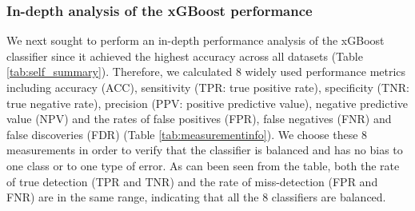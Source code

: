 \documentclass{bmcart}
\begin{document}
\subsubsection*{In-depth analysis of the xGBoost performance}
We next sought to perform an in-depth performance analysis of the xGBoost classifier since it achieved the highest accuracy across all datasets (Table \ref{tab:self_summary}). Therefore, we calculated 8 widely used performance metrics including accuracy (ACC), sensitivity (TPR: true positive rate), speciﬁcity (TNR: true negative rate), precision (PPV: positive predictive value), negative predictive value (NPV) and the rates of false positives (FPR), false negatives (FNR) and false discoveries (FDR) (Table \ref{tab:measurementinfo}). We choose these 8 measurements in order to verify that the classifier is balanced and has no bias to one class or to one type of error. As can been seen from the table, both the rate of true detection (TPR and TNR) and the rate of miss-detection (FPR and FNR) are in the same range, indicating that all the 8 classifiers are balanced.


\end{document}
